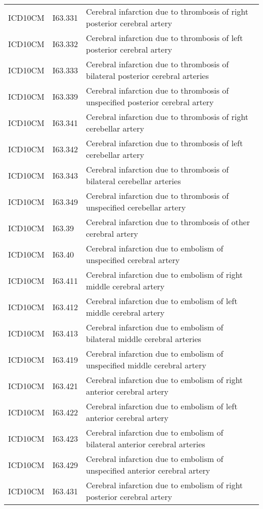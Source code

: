 \begin{longtable}{p{}p{}p{}}
  ICD10CM & I63.331 & Cerebral infarction due to thrombosis of right posterior cerebral artery \\ 
  ICD10CM & I63.332 & Cerebral infarction due to thrombosis of left posterior cerebral artery \\ 
  ICD10CM & I63.333 & Cerebral infarction due to thrombosis of bilateral posterior cerebral arteries \\ 
  ICD10CM & I63.339 & Cerebral infarction due to thrombosis of unspecified posterior cerebral artery \\ 
  ICD10CM & I63.341 & Cerebral infarction due to thrombosis of right cerebellar artery \\ 
  ICD10CM & I63.342 & Cerebral infarction due to thrombosis of left cerebellar artery \\ 
  ICD10CM & I63.343 & Cerebral infarction due to thrombosis of bilateral cerebellar arteries \\ 
  ICD10CM & I63.349 & Cerebral infarction due to thrombosis of unspecified cerebellar artery \\ 
  ICD10CM & I63.39 & Cerebral infarction due to thrombosis of other cerebral artery \\ 
  ICD10CM & I63.40 & Cerebral infarction due to embolism of unspecified cerebral artery \\ 
  ICD10CM & I63.411 & Cerebral infarction due to embolism of right middle cerebral artery \\ 
  ICD10CM & I63.412 & Cerebral infarction due to embolism of left middle cerebral artery \\ 
  ICD10CM & I63.413 & Cerebral infarction due to embolism of bilateral middle cerebral arteries \\ 
  ICD10CM & I63.419 & Cerebral infarction due to embolism of unspecified middle cerebral artery \\ 
  ICD10CM & I63.421 & Cerebral infarction due to embolism of right anterior cerebral artery \\ 
  ICD10CM & I63.422 & Cerebral infarction due to embolism of left anterior cerebral artery \\ 
  ICD10CM & I63.423 & Cerebral infarction due to embolism of bilateral anterior cerebral arteries \\ 
  ICD10CM & I63.429 & Cerebral infarction due to embolism of unspecified anterior cerebral artery \\ 
  ICD10CM & I63.431 & Cerebral infarction due to embolism of right posterior cerebral artery \\ 

\end{longtable}
